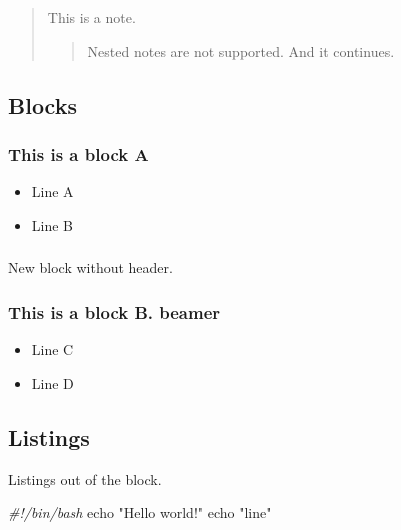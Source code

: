 \documentclass[
  11pt,
  ignorenonframetext,
]{article}
\newenvironment{Shaded}{}{}
\newcommand{\BuiltInTok}[1]{\textcolor[rgb]{0.00,0.50,0.00}{#1}}
\newcommand{\CommentTok}[1]{\textcolor[rgb]{0.38,0.63,0.69}{\textit{#1}}}
\newcommand{\StringTok}[1]{\textcolor[rgb]{0.25,0.44,0.63}{#1}}
\providecommand{\tightlist}{%
  \setlength{\itemsep}{0pt}\setlength{\parskip}{0pt}}
\begin{document}
\begin{quote}
This is a note.

\begin{quote}
Nested notes are not supported. And it continues.
\end{quote}
\end{quote}

\subsection{Blocks}\label{blocks}

\subsubsection{This is a block A}\label{this-is-a-block-a}

\begin{itemize}
\tightlist
\item
  Line A
\item
  Line B
\end{itemize}

\subsubsection{}\label{section}

New block without header.

\subsubsection{This is a block B.
beamer}\label{this-is-a-block-b.-beamer}

\begin{itemize}
\tightlist
\item
  Line C
\item
  Line D
\end{itemize}

\subsection{Listings}\label{listings}

Listings out of the block.

\begin{Shaded}
\begin{Highlighting}[]
\CommentTok{\#!/bin/bash}
\BuiltInTok{echo} \StringTok{"Hello world!"}
\BuiltInTok{echo} \StringTok{"line"}
\end{Highlighting}
\end{Shaded}
\end{document}
